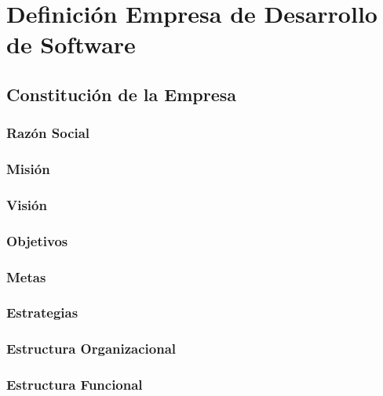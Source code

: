 \chapter{Definici\'on Empresa de Desarrollo de Software}
\section{Constituci\'on de la Empresa}
\subsection{Raz\'on Social}

\subsection{Misi\'on}

\subsection{Visi\'on}

\subsection{Objetivos}

\subsection{Metas}

\subsection{Estrategias}

\subsection{Estructura Organizacional}

\subsection{Estructura Funcional}